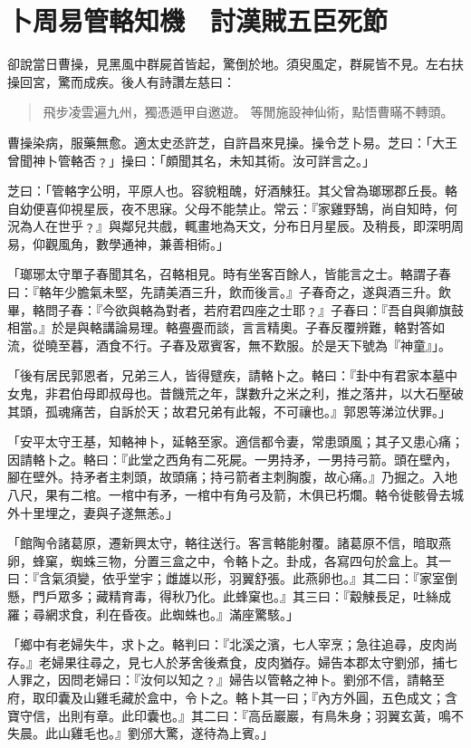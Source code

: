
\chapter{卜周易管輅知機　討漢賊五臣死節}

卻說當日曹操，見黑風中群屍首皆起，驚倒於地。須臾風定，群屍皆不見。左右扶操回宮，驚而成疾。後人有詩讚左慈曰：

\begin{quote}
飛步凌雲遍九州，獨憑遁甲自邀遊。
等閒施設神仙術，點悟曹瞞不轉頭。
\end{quote}

曹操染病，服藥無愈。適太史丞許芝，自許昌來見操。操令芝卜易。芝曰：「大王曾聞神卜管輅否﹖」操曰：「頗聞其名，未知其術。汝可詳言之。」

芝曰：「管輅字公明，平原人也。容貌粗醜，好酒觫狂。其父曾為瑯琊郡丘長。輅自幼便喜仰視星辰，夜不思寐。父母不能禁止。常云：『家雞野鵠，尚自知時，何況為人在世乎﹖』與鄰兒共戲，輒畫地為天文，分布日月星辰。及稍長，即深明周易，仰觀風角，數學通神，兼善相術。」

「瑯琊太守單子春聞其名，召輅相見。時有坐客百餘人，皆能言之士。輅謂子春曰：『輅年少膽氣未堅，先請美酒三升，飲而後言。』子春奇之，遂與酒三升。飲畢，輅問子春：『今欲與輅為對者，若府君四座之士耶﹖』子春曰：『吾自與卿旗鼓相當。』於是與輅講論易理。輅亹亹而談，言言精奧。子春反覆辨難，輅對答如流，從曉至暮，酒食不行。子春及眾賓客，無不歎服。於是天下號為『神童』」。

「後有居民郭恩者，兄弟三人，皆得躄疾，請輅卜之。輅曰：『卦中有君家本墓中女鬼，非君伯母即叔母也。昔饑荒之年，謀數升之米之利，推之落井，以大石壓破其頭，孤魂痛苦，自訴於天；故君兄弟有此報，不可禳也。』郭恩等涕泣伏罪。」

「安平太守王基，知輅神卜，延輅至家。適信都令妻，常患頭風；其子又患心痛；因請輅卜之。輅曰：『此堂之西角有二死屍。一男持矛，一男持弓箭。頭在壁內，腳在壁外。持矛者主刺頭，故頭痛；持弓箭者主刺胸腹，故心痛。』乃掘之。入地八尺，果有二棺。一棺中有矛，一棺中有角弓及箭，木俱已朽爛。輅令徙骸骨去城外十里埋之，妻與子遂無恙。」

「館陶令諸葛原，遷新興太守，輅往送行。客言輅能射覆。諸葛原不信，暗取燕卵，蜂窠，蜘蛛三物，分置三盒之中，令輅卜之。卦成，各寫四句於盒上。其一曰：『含氣須變，依乎堂宇；雌雄以形，羽翼舒張。此燕卵也。』其二曰：『家室倒懸，門戶眾多；藏精育毒，得秋乃化。此蜂窠也。』其三曰：『觳觫長足，吐絲成羅；尋網求食，利在昏夜。此蜘蛛也。』滿座驚駭。」

「鄉中有老婦失牛，求卜之。輅判曰：『北溪之濱，七人宰烹；急往追尋，皮肉尚存。』老婦果往尋之，見七人於茅舍後煮食，皮肉猶存。婦告本郡太守劉邠，捕七人罪之，因問老婦曰：『汝何以知之﹖』婦告以管輅之神卜。劉邠不信，請輅至府，取印囊及山雞毛藏於盒中，令卜之。輅卜其一曰；『內方外圓，五色成文；含寶守信，出則有章。此印囊也。』其二曰：『高岳巖巖，有鳥朱身；羽翼玄黃，鳴不失晨。此山雞毛也。』劉邠大驚，遂待為上賓。」

